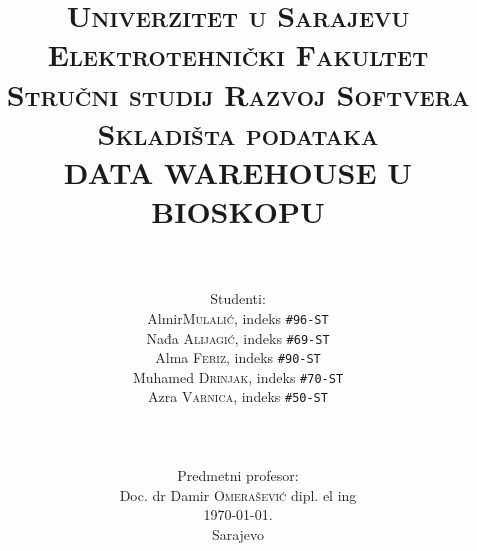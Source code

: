 \newcommand{\HRule}[1]{\rule{\linewidth}{#1}} 	

\makeatletter							%
\def\printtitle{%
    {\centering \@title\par}}
\makeatother									

\makeatletter							%
\def\printauthor{%
    {\centering \large \@author}}				
\makeatother							

\title{	
		\normalsize \textsc{Univerzitet u Sarajevu}\\ 	
		\normalsize \textsc{Elektrotehnički Fakultet}\\ 	
		    \textsc{Stručni studij Razvoj Softvera}\\[4.0cm]
		 	\textsc{Skladišta podataka}\\		
			\LARGE \textbf{\uppercase{Data warehouse u bioskopu}}\\[2.0cm]	
		}

\author{
	    \rule{12cm}{0.3pt}\\[0.25cm]
        \Large Studenti:\\ %
	Almir\textsc{Mulalić}, indeks \texttt{\#96-ST} \\
	Nađa \textsc{Alijagić}, indeks \texttt{\#69-ST} \\
	Alma \textsc{Feriz}, indeks \texttt{\#90-ST} \\
	Muhamed \textsc{Drinjak}, indeks \texttt{\#70-ST} \\
	Azra \textsc{Varnica}, indeks \texttt{\#50-ST} \\
       \rule{12cm}{0.3pt}\\[0.25cm]
              \vfill
        Predmetni profesor:\\
       Doc. dr Damir \textsc{Omerašević} dipl. el ing\\
        \vfill
        \today.\\ Sarajevo\\			%
}

